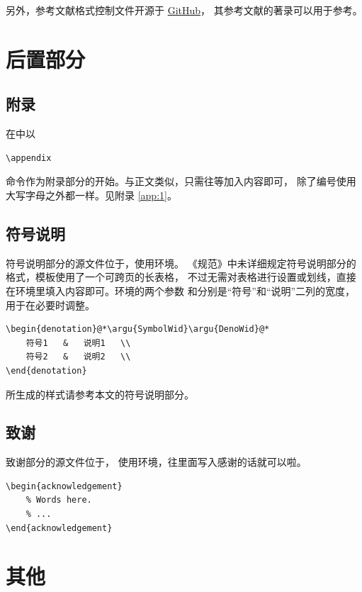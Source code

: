 另外，参考文献格式控制文件开源于
\href{https://github.com/Haixing-Hu/GBT7714-2005-BibTeX-Style}{GitHub}，
其参考文献的著录可以用于参考。

\section{后置部分}\label{sec:backmatter}
\subsection{附录}\label{sec:app}
在中以
\begin{lstlisting}[numbers=none]
\appendix
		\end{lstlisting}
命令作为附录部分的开始。与正文类似，只需往等加入内容即可，
除了编号使用大写字母之外都一样。见附录 \ref{app:1}。

\subsection{符号说明}\label{sec:deno}
符号说明部分的源文件位于，使用环境。
《规范》中未详细规定符号说明部分的格式，模板使用了一个可跨页的长表格，
不过无需对表格进行设置或划线，直接在环境里填入内容即可。环境的两个参数
和分别是“符号”和“说明”二列的宽度，用于在必要时调整。

\begin{lstlisting}
\begin{denotation}@*\argu{SymbolWid}\argu{DenoWid}@*
	符号1   &   说明1   \\
	符号2   &   说明2   \\
\end{denotation}
		\end{lstlisting}
所生成的样式请参考本文的符号说明部分。

\subsection{致谢}
致谢部分的源文件位于，
使用环境，往里面写入感谢的话就可以啦。
\begin{lstlisting}
\begin{acknowledgement}
	% Words here.
	% ...
\end{acknowledgement}
		\end{lstlisting}

\section{其他}\label{sec:other}

